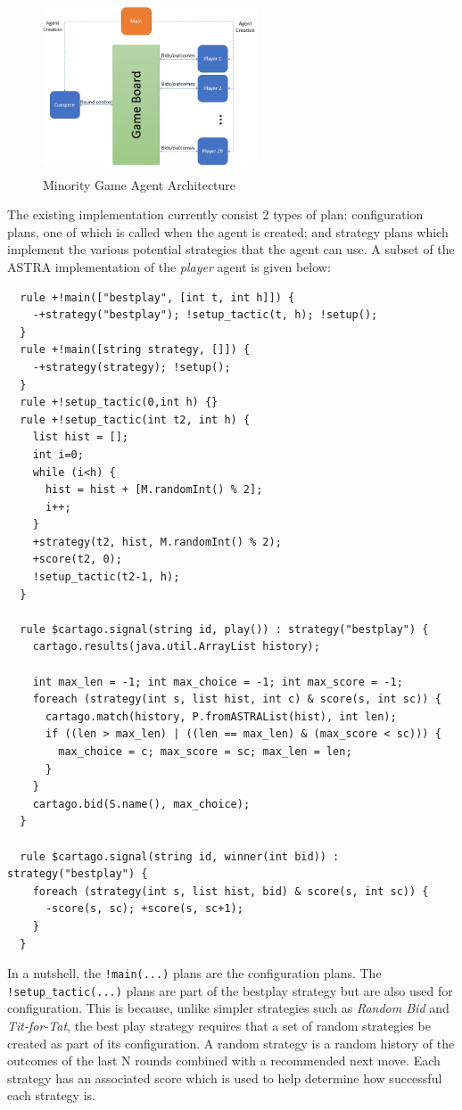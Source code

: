 \begin{figure}[!tbh]
\centering
\includegraphics[height=2in, width=2.5in]{mg.png}
\caption{Minority Game Agent Architecture}
\label{fig:mgagents}
\end{figure}

The existing implementation currently consist 2 types of plan: configuration plans, one of which is
called when the agent is created; and strategy plans which implement the various potential strategies
that the agent can use. A subset of the ASTRA implementation of the \emph{player} agent is given below:

{\small
\begin{verbatim}
  rule +!main(["bestplay", [int t, int h]]) {
    -+strategy("bestplay"); !setup_tactic(t, h); !setup();
  }
  rule +!main([string strategy, []]) { 
    -+strategy(strategy); !setup();
  }
  rule +!setup_tactic(0,int h) {}
  rule +!setup_tactic(int t2, int h) {
    list hist = [];
    int i=0;
    while (i<h) {
      hist = hist + [M.randomInt() % 2];
      i++;
    }
    +strategy(t2, hist, M.randomInt() % 2);
    +score(t2, 0);
    !setup_tactic(t2-1, h);
  }
		
  rule $cartago.signal(string id, play()) : strategy("bestplay") {
    cartago.results(java.util.ArrayList history);
		
    int max_len = -1; int max_choice = -1; int max_score = -1;
    foreach (strategy(int s, list hist, int c) & score(s, int sc)) {
      cartago.match(history, P.fromASTRAList(hist), int len);
      if ((len > max_len) | ((len == max_len) & (max_score < sc))) {
        max_choice = c;	max_score = sc; max_len = len;
      }
    }
    cartago.bid(S.name(), max_choice);
  }
		
  rule $cartago.signal(string id, winner(int bid)) : strategy("bestplay") {
    foreach (strategy(int s, list hist, bid) & score(s, int sc)) {
      -score(s, sc); +score(s, sc+1);
    }
  }
\end{verbatim}}

In a nutshell, the \verb|!main(...)| plans are the configuration plans. The \verb|!setup_tactic(...)| 
plans are part of the bestplay strategy but are also used for configuration. This is because, unlike
simpler strategies such as \emph{Random Bid} and \emph{Tit-for-Tat}, the best play strategy requires 
that a set of random strategies be created as part of its configuration. A random strategy is
a random history of the outcomes of the last N rounds combined with a recommended next move. Each
strategy has an associated score which is used to help determine how successful each strategy is.

